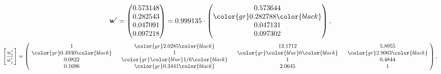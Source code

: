 \begin{example}
\begin{equation*}
\mathbf{w}^{\prime} =
\begin{pmatrix}
0.573148\\
0.282543\\
0.047091\\
0.097218
\end{pmatrix} =
0.999135\cdot
\begin{pmatrix}
0.573644\\
\color{gr} 0.282788\color{black} \\
0.047131\\
0.097302
\end{pmatrix},
\end{equation*}
\begin{equation*}
\left[ \frac{{w}^{\prime}_i}{{w}^{\prime}_j} \right] =
\begin{pmatrix}
$\,\,$ 1 $\,\,$ & $\,\,$\color{gr} 2.0285\color{black} $\,\,$ & $\,\,$12.1712$\,\,$ & $\,\,$5.8955$\,\,$ \\
$\,\,$\color{gr} 0.4930\color{black} $\,\,$ & $\,\,$ 1 $\,\,$ & $\,\,$\color{gr} \color{blue} 6\color{black} $\,\,$ & $\,\,$\color{gr} 2.9063\color{black}   $\,\,$ \\
$\,\,$0.0822$\,\,$ & $\,\,$\color{gr} \color{blue}  1/6\color{black} $\,\,$ & $\,\,$ 1 $\,\,$ & $\,\,$0.4844 $\,\,$ \\
$\,\,$0.1696$\,\,$ & $\,\,$\color{gr} 0.3441\color{black} $\,\,$ & $\,\,$2.0645$\,\,$ & $\,\,$ 1  $\,\,$ \\
\end{pmatrix},
\end{equation*}
\end{example}
\newpage
